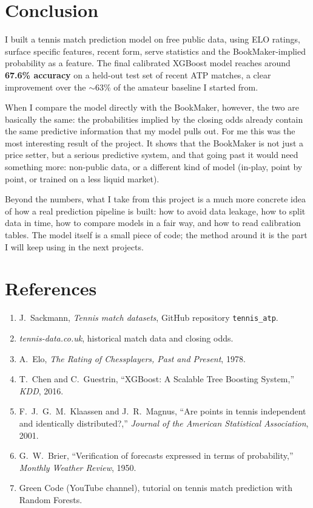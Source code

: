 \documentclass[10pt,twocolumn]{article}
\begin{document}
\section{Conclusion}
I built a tennis match prediction model on free public data, using
ELO ratings, surface specific features, recent form, serve statistics
and the BookMaker-implied probability as a feature. The final
calibrated XGBoost model reaches around \textbf{67.6\% accuracy} on a
held-out test set of recent ATP matches, a clear improvement over the
\(\sim 63\%\) of the amateur baseline I started from.

When I compare the model directly with the BookMaker, however, the
two are basically the same: the probabilities implied by the closing
odds already contain the same predictive information that my model
pulls out. For me this was the most interesting result of the
project. It shows that the BookMaker is not just a price setter, but
a serious predictive system, and that going past it would need
something more: non-public data, or a different kind of model
(in-play, point by point, or trained on a less liquid market).

Beyond the numbers, what I take from this project is a much more
concrete idea of how a real prediction pipeline is built: how to
avoid data leakage, how to split data in time, how to compare models
in a fair way, and how to read calibration tables. The model itself
is a small piece of code; the method around it is the part I will
keep using in the next projects.

\section{References}
\begin{enumerate}[leftmargin=1.6em,itemsep=1pt]
  \item J.~Sackmann, \textit{Tennis match datasets}, GitHub repository
        \texttt{tennis\_atp}.
  \item \textit{tennis-data.co.uk}, historical match data and closing
        odds.
  \item A.~Elo, \textit{The Rating of Chessplayers, Past and Present},
        1978.
  \item T.~Chen and C.~Guestrin, ``XGBoost: A Scalable Tree Boosting
        System,'' \textit{KDD}, 2016.
  \item F.~J.~G.~M.~Klaassen and J.~R.~Magnus, ``Are points in tennis
        independent and identically distributed?,'' \textit{Journal of
        the American Statistical Association}, 2001.
  \item G.~W.~Brier, ``Verification of forecasts expressed in terms of
        probability,'' \textit{Monthly Weather Review}, 1950.
  \item Green Code (YouTube channel), tutorial on tennis match
        prediction with Random Forests.
\end{enumerate}
\end{document}
